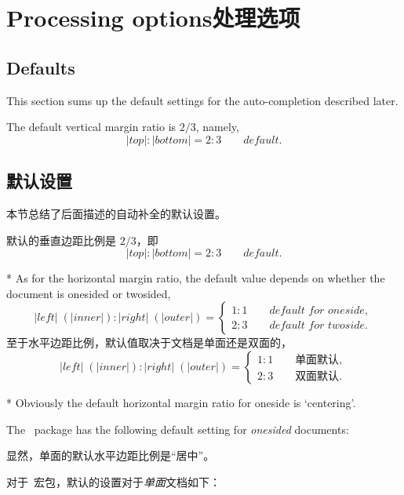 
 \section{Processing options\hfill 处理选项}\label{sec:process}
 
% 
% 
%  


\begin{paracol}{2}
 \subsection{Defaults}\label{sec:defaults}

 This section sums up the default settings for the auto-completion
 described later.
 
 The default vertical margin ratio is $2/3$, namely,
 \begin{equation}
  |top| : |bottom| = 2 : 3 \qquad\textit{default}.
 \end{equation}
\switchcolumn
\subsection{默认设置}

本节总结了后面描述的自动补全的默认设置。
 
默认的垂直边距比例是 $2/3$，即
 \begin{equation}
  |top| : |bottom| = 2 : 3 \qquad\textit{default}.
 \end{equation}

 \switchcolumn[0]*
 As for the horizontal margin ratio, the default value depends on
 whether the document is onesided or twosided,
 \begin{equation}
  |left|\;(|inner|) : |right|\;(|outer|) 
       = \left\{ \begin{array}{ll}
              1 : 1 \qquad\textit{default for oneside},\\
              2 : 3 \qquad\textit{default for twoside}.
         \end{array}\right.
 \end{equation}
\switchcolumn
至于水平边距比例，默认值取决于文档是单面还是双面的，
\begin{equation}
|left|\;(|inner|) : |right|\;(|outer|) 
    = \left\{ \begin{array}{ll}
            1 : 1 \qquad\textit{单面默认},\\
            2 : 3 \qquad\textit{双面默认}.
        \end{array}\right.
 \end{equation}

 \switchcolumn[0]*
 Obviously the default horizontal margin ratio for oneside is `centering'.

 The \Gm\ package has the following default setting for
 \textit{onesided} documents:

 \switchcolumn
 显然，单面的默认水平边距比例是“居中”。

 对于\Gm\ 宏包，默认的设置对于\textit{单面}文档如下：
\end{paracol}

